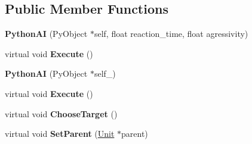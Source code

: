 \subsection*{Public Member Functions}
\begin{DoxyCompactItemize}
\item 
{\bfseries Python\+AI} (Py\+Object $\ast$self, float reaction\+\_\+time, float agressivity)\hypertarget{classPythonAI_a699e59861c0686c5255c56886fcdb4e4}{}\label{classPythonAI_a699e59861c0686c5255c56886fcdb4e4}

\item 
virtual void {\bfseries Execute} ()\hypertarget{classPythonAI_a086e6f884537d5536c2f01ab97e56910}{}\label{classPythonAI_a086e6f884537d5536c2f01ab97e56910}

\item 
{\bfseries Python\+AI} (Py\+Object $\ast$self\+\_\+)\hypertarget{classPythonAI_a6d7527da61f73714eba4a511383a2ec3}{}\label{classPythonAI_a6d7527da61f73714eba4a511383a2ec3}

\item 
virtual void {\bfseries Execute} ()\hypertarget{classPythonAI_a105dace4b5285e5ddf229faada894f98}{}\label{classPythonAI_a105dace4b5285e5ddf229faada894f98}

\item 
virtual void {\bfseries Choose\+Target} ()\hypertarget{classPythonAI_a5efe9005e76eea50b6ed882f317d16c5}{}\label{classPythonAI_a5efe9005e76eea50b6ed882f317d16c5}

\item 
virtual void {\bfseries Set\+Parent} (\hyperlink{classUnit}{Unit} $\ast$parent)\hypertarget{classPythonAI_a9f20d035a0c5bcf4ccada4d18b451776}{}\label{classPythonAI_a9f20d035a0c5bcf4ccada4d18b451776}

\end{DoxyCompactItemize}
